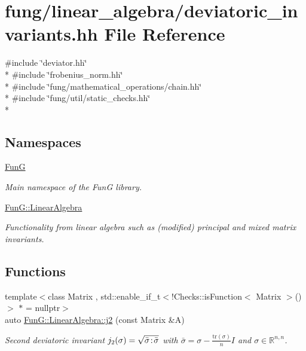 \hypertarget{deviatoric__invariants_8hh}{\section{fung/linear\-\_\-algebra/deviatoric\-\_\-invariants.hh File Reference}
\label{deviatoric__invariants_8hh}
}
{\ttfamily \#include \char`\"{}deviator.\-hh\char`\"{}}\\*
{\ttfamily \#include \char`\"{}frobenius\-\_\-norm.\-hh\char`\"{}}\\*
{\ttfamily \#include \char`\"{}fung/mathematical\-\_\-operations/chain.\-hh\char`\"{}}\\*
{\ttfamily \#include \char`\"{}fung/util/static\-\_\-checks.\-hh\char`\"{}}\\*
\subsection*{Namespaces}
\begin{DoxyCompactItemize}
\item 
\hyperlink{namespaceFunG}{Fun\-G}
\begin{DoxyCompactList}\small\item\em Main namespace of the Fun\-G library. \end{DoxyCompactList}\item 
\hyperlink{namespaceFunG_1_1LinearAlgebra}{Fun\-G\-::\-Linear\-Algebra}
\begin{DoxyCompactList}\small\item\em Functionality from linear algebra such as (modified) principal and mixed matrix invariants. \end{DoxyCompactList}\end{DoxyCompactItemize}
\subsection*{Functions}
\begin{DoxyCompactItemize}
\item 
{\footnotesize template$<$class Matrix , std\-::enable\-\_\-if\-\_\-t$<$!\-Checks\-::is\-Function$<$ Matrix $>$()$>$ $\ast$  = nullptr$>$ }\\auto \hyperlink{group__InvariantGroup_ga9a2bc859fe1ae34b1a3ada91a39d69df}{Fun\-G\-::\-Linear\-Algebra\-::j2} (const Matrix \&A)
\begin{DoxyCompactList}\small\item\em Second deviatoric invariant $ j_2(\sigma)=\sqrt{\bar\sigma\negthinspace:\negthinspace\bar\sigma} $ with $\bar\sigma = \sigma - \frac{\mathrm{tr}(\sigma)}{n}I$ and $\sigma\in\mathbb{R}^{n,n}$. \end{DoxyCompactList}\end{DoxyCompactItemize}
